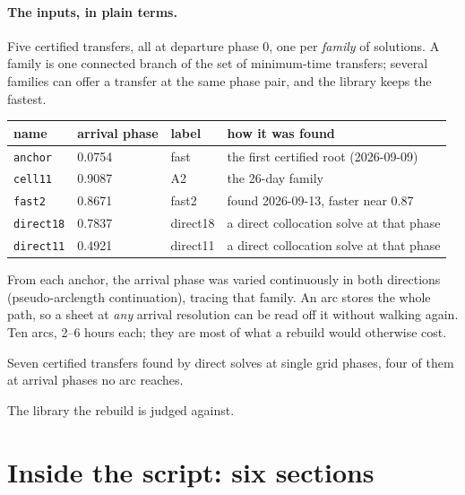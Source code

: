 \documentclass[11pt]{article}
\renewcommand{\_}{\textunderscore\allowbreak}
\newcommand{\code}[1]{\texttt{#1}}
\begin{document}
\paragraph{The inputs, in plain terms.}
\begin{description}[leftmargin=2.2cm, style=nextline, itemsep=2pt]
\item[Anchors] Five certified transfers, all at departure phase 0, one per
  \emph{family} of solutions. A family is one connected branch of the set
  of minimum-time transfers; several families can offer a transfer at the
  same phase pair, and the library keeps the fastest.
  \begin{center}\small
  \begin{tabular}{@{}llll@{}}
  \toprule name & arrival phase & label & how it was found\\\midrule
  \code{anchor} & 0.0754 & fast & the first certified root (2026-09-09)\\
  \code{cell11} & 0.9087 & A2 & the 26-day family\\
  \code{fast2} & 0.8671 & fast2 & found 2026-09-13, faster near 0.87\\
  \code{direct18} & 0.7837 & direct18 & a direct collocation solve at that phase\\
  \code{direct11} & 0.4921 & direct11 & a direct collocation solve at that phase\\
  \bottomrule
  \end{tabular}
  \end{center}
\item[Arcs] From each anchor, the arrival phase was varied continuously in
  both directions (pseudo-arclength continuation), tracing that family.
  An arc stores the whole path, so a sheet at \emph{any} arrival resolution
  can be read off it without walking again. Ten arcs, 2--6 hours each; they
  are most of what a rebuild would otherwise cost.
\item[Seed roots] Seven certified transfers found by direct solves at
  single grid phases, four of them at arrival phases no arc reaches.
\item[Record] The library the rebuild is judged against.
\end{description}

\section{Inside the script: six sections}
\end{document}
